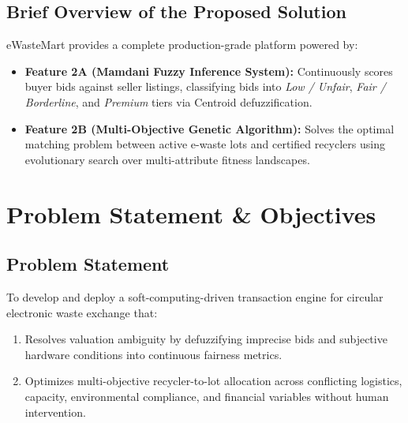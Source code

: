 \documentclass[12pt,a4paper]{article}
\begin{document}
\subsection{Brief Overview of the Proposed Solution}
eWasteMart provides a complete production-grade platform powered by:
\begin{itemize}
    \item \textbf{Feature 2A (Mamdani Fuzzy Inference System):} Continuously scores buyer bids against seller listings, classifying bids into \textit{Low / Unfair}, \textit{Fair / Borderline}, and \textit{Premium} tiers via Centroid defuzzification.
    \item \textbf{Feature 2B (Multi-Objective Genetic Algorithm):} Solves the optimal matching problem between active e-waste lots and certified recyclers using evolutionary search over multi-attribute fitness landscapes.
\end{itemize}

\section{Problem Statement \& Objectives}

\subsection{Problem Statement}
To develop and deploy a soft-computing-driven transaction engine for circular electronic waste exchange that:
\begin{enumerate}
    \item Resolves valuation ambiguity by defuzzifying imprecise bids and subjective hardware conditions into continuous fairness metrics.
    \item Optimizes multi-objective recycler-to-lot allocation across conflicting logistics, capacity, environmental compliance, and financial variables without human intervention.
\end{enumerate}
\end{document}
